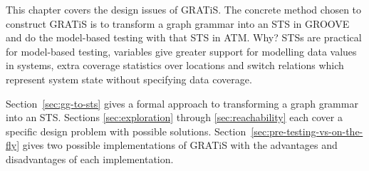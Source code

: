 This chapter covers the design issues of GRATiS. The concrete method chosen to construct GRATiS is to transform a graph grammar into an STS in GROOVE and do the model-based testing with that STS in ATM. Why? STSs are practical for model-based testing, variables give greater support for modelling data values in systems, extra coverage statistics over locations and switch relations which represent system state without specifying data coverage.

Section~\ref{sec:gg-to-sts} gives a formal approach to transforming a graph grammar into an STS. Sections \ref{sec:exploration} through \ref{sec:reachability} each cover a specific design problem with possible solutions. Section~\ref{sec:pre-testing-vs-on-the-fly} gives two possible implementations of GRATiS with the advantages and disadvantages of each implementation.

